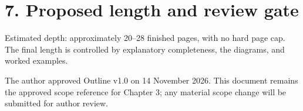 \section*{7. Proposed length and review gate}
Estimated depth: approximately 20--28 finished pages, with no hard page cap. The final length is controlled by explanatory completeness, the diagrams, and worked examples.

\begin{takeawaybox}
The author approved Outline v1.0 on 14 November 2026. This document remains the approved scope reference for Chapter 3; any material scope change will be submitted for author review.
\end{takeawaybox}

